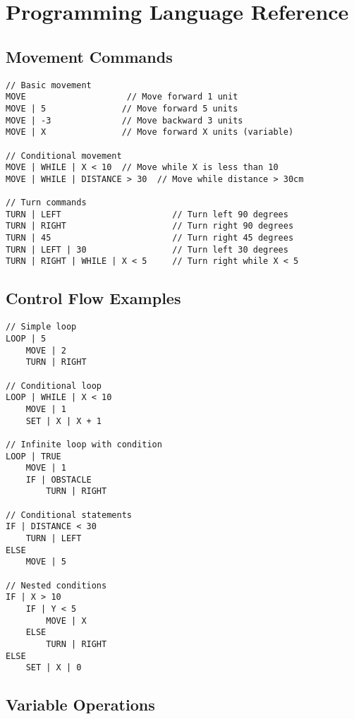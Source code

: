 \section{Programming Language Reference}

\subsection{Movement Commands}

\begin{lstlisting}[caption=Movement Command Examples]
// Basic movement
MOVE                    // Move forward 1 unit
MOVE | 5               // Move forward 5 units
MOVE | -3              // Move backward 3 units
MOVE | X               // Move forward X units (variable)

// Conditional movement
MOVE | WHILE | X < 10  // Move while X is less than 10
MOVE | WHILE | DISTANCE > 30  // Move while distance > 30cm

// Turn commands
TURN | LEFT                      // Turn left 90 degrees
TURN | RIGHT                     // Turn right 90 degrees
TURN | 45                        // Turn right 45 degrees
TURN | LEFT | 30                 // Turn left 30 degrees
TURN | RIGHT | WHILE | X < 5     // Turn right while X < 5
\end{lstlisting}

\subsection{Control Flow Examples}

\begin{lstlisting}[caption=Control Flow Examples]
// Simple loop
LOOP | 5
    MOVE | 2
    TURN | RIGHT

// Conditional loop
LOOP | WHILE | X < 10
    MOVE | 1
    SET | X | X + 1

// Infinite loop with condition
LOOP | TRUE
    MOVE | 1
    IF | OBSTACLE
        TURN | RIGHT

// Conditional statements
IF | DISTANCE < 30
    TURN | LEFT
ELSE
    MOVE | 5

// Nested conditions
IF | X > 10
    IF | Y < 5
        MOVE | X
    ELSE
        TURN | RIGHT
ELSE
    SET | X | 0
\end{lstlisting}

\subsection{Variable Operations}

